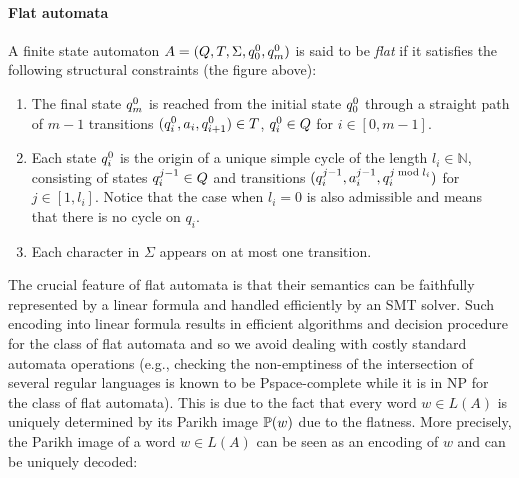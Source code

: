 \documentclass[sigplan,review,anonymous]{acmart}\settopmatter{printfolios=true,printccs=false,printacmref=false}
\begin{document}
\paragraph{Flat automata} 
A finite state automaton  
$A = (Q,T,\Sigma,q_{0}^{0},q_{m}^{0})$ is said to be \emph{flat} if it satisfies the following structural constraints (the figure above):
\begin{enumerate}
	\item The final state $q_{m}^{0}$ is reached from  the initial state $q_{0}^{0}$ through a straight path of $m-1$ transitions $(q_{i}^{0},a_i,q_{i+1}^{0}) \in T$, $q_{i}^{0} \in Q$ for $i\in[0,m-1]$. 
	\item  
Each state $q_{i}^{0}$ is the origin of a unique simple cycle of the length $l_i\in\mathbb{N}$, consisting of states $q_{i}^{j-1} \in Q$ and transitions $(q_{i}^{j-1}, a_{i}^{j-1}, q_{i}^{j \bmod l_i})$ for $j\in [1,l_i]$. 
Notice that the case when $l_i = 0$ is also admissible and means that there is no cycle on $q_i$.
	\item Each character in $\Sigma$ appears on at most one transition. 
\end{enumerate} 

The crucial feature of flat automata is that their semantics can be faithfully represented by a linear formula and handled efficiently by an SMT solver. Such encoding into linear formula results in efficient algorithms and decision procedure for the class of flat automata and so we avoid dealing with costly standard automata operations (e.g., checking  the non-emptiness of the intersection of several regular languages
 is known to be {\sc Pspace}-complete while it is in {\sc NP} for the class of flat automata).
This is due to the fact that 
every word $w\in L(A)$ is uniquely determined by its Parikh image $\mathbb{P}{(w)}$ due to the flatness. 
More precisely, the Parikh image of a word $w\in L(A)$ can be seen as an encoding of $w$ and can be uniquely decoded:
\end{document}
